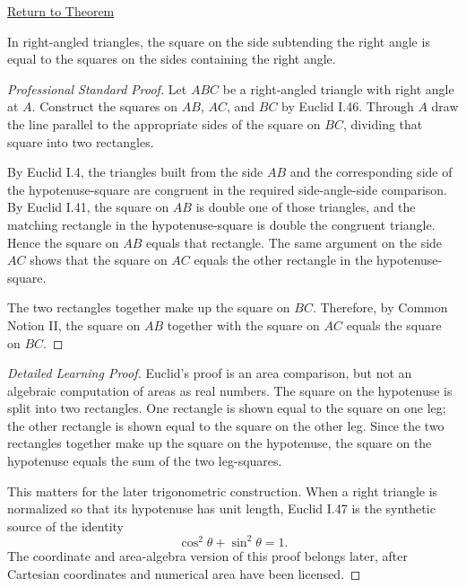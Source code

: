 \newpage
{}
\label{prf:euclid-i-47}

\begin{remark*}[Return]
\hyperref[thm:euclid-i-47]{Return to Theorem}
\end{remark*}

\begin{theorem*}
In right-angled triangles, the square on the side subtending the right angle is
equal to the squares on the sides containing the right angle.
\end{theorem*}

\begin{proof}[Professional Standard Proof]
\LRAProofBodyStart


Let $ABC$ be a right-angled triangle with right angle at $A$. Construct the
squares on $AB$, $AC$, and $BC$ by Euclid I.46. Through $A$ draw the line
parallel to the appropriate sides of the square on $BC$, dividing that square
into two rectangles.

By Euclid I.4, the triangles built from the side $AB$ and the corresponding
side of the hypotenuse-square are congruent in the required side-angle-side
comparison. By Euclid I.41, the square on $AB$ is double one of those
triangles, and the matching rectangle in the hypotenuse-square is double the
congruent triangle. Hence the square on $AB$ equals that rectangle. The same
argument on the side $AC$ shows that the square on $AC$ equals the other
rectangle in the hypotenuse-square.

The two rectangles together make up the square on $BC$. Therefore, by Common
Notion II, the square on $AB$ together with the square on $AC$ equals the
square on $BC$.
\end{proof}

\begin{proof}[Detailed Learning Proof]
\LRAProofBodyStart
Euclid's proof is an area comparison, but not an algebraic computation of
areas as real numbers. The square on the hypotenuse is split into two
rectangles. One rectangle is shown equal to the square on one leg; the other
rectangle is shown equal to the square on the other leg. Since the two
rectangles together make up the square on the hypotenuse, the square on the
hypotenuse equals the sum of the two leg-squares.

This matters for the later trigonometric construction. When a right triangle
is normalized so that its hypotenuse has unit length, Euclid I.47 is the
synthetic source of the identity
\[
  \cos^2\theta+\sin^2\theta=1.
\]
The coordinate and area-algebra version of this proof belongs later, after
Cartesian coordinates and numerical area have been licensed.
\end{proof}

